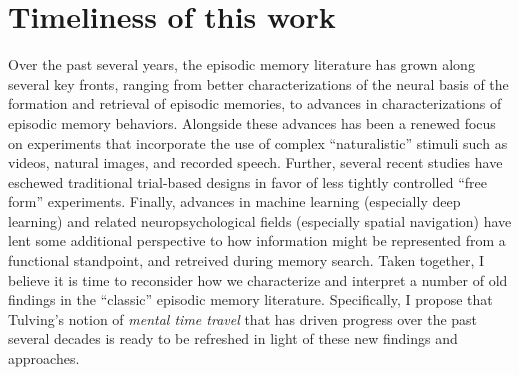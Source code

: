 \documentclass[12pt]{article}
\begin{document}
\section*{Timeliness of this work}
Over the past several years, the episodic memory literature has grown along several key fronts, ranging from better characterizations of the neural basis of the formation and retrieval of episodic memories, to advances in characterizations of episodic memory behaviors.  Alongside these advances has been a renewed focus on experiments that incorporate the use of complex ``naturalistic'' stimuli such as videos, natural images, and recorded speech.  Further, several recent studies have eschewed traditional trial-based designs in favor of less tightly controlled ``free form'' experiments.  Finally, advances in machine learning (especially deep learning) and related neuropsychological fields (especially spatial navigation) have lent some additional perspective to how information might be represented from a functional standpoint, and retreived during memory search.  Taken together, I believe it is time to reconsider how we characterize and interpret a number of old findings in the ``classic'' episodic memory literature.  Specifically, I propose that Tulving's notion of \textit{mental time travel} that has driven progress over the past several decades is ready to be refreshed in light of these new findings and approaches.

\nocite{AlyEtal18, BaldEtal17, BaldEtal18, BrunEtal18, ChenEtal17, FolkEtal18, LohnEtal18, MauEtal18, McKeBuzs16, Rang18, TsaoEtal18, BrigEtal18, GatyEtal16, IsolEtal17, JollChan18, LongKaha18, StYvNase18}

\renewcommand\refname{Key recent papers}


\end{document}
